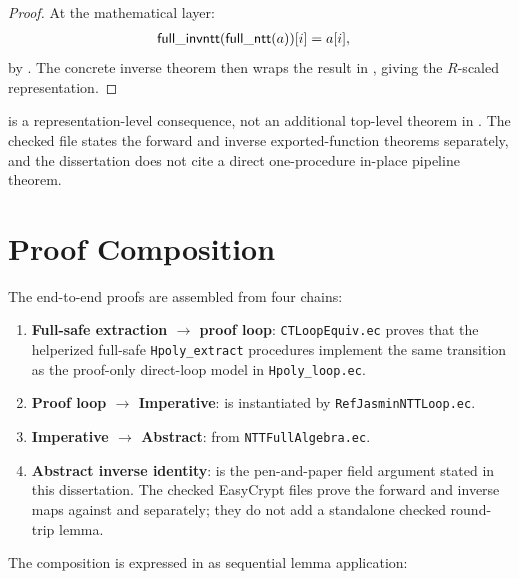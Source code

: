 \begin{proof}
  At the mathematical layer:
  \begin{align*}
    \mathsf{full\_invntt}(\mathsf{full\_ntt}(a))[i]
    &= a[i],
  \end{align*}
  by .  The concrete inverse theorem then wraps the
  result in , giving the \(R\)-scaled representation.
\end{proof}

 is a representation-level consequence, not an additional
top-level theorem in .  The checked file states the forward
and inverse exported-function theorems separately, and the dissertation does
not cite a direct one-procedure in-place pipeline theorem.

\section{Proof Composition}

The end-to-end proofs are assembled from four chains:

\begin{enumerate}
  \item \textbf{Full-safe extraction $\to$ proof loop}:
        \texttt{CTLoopEquiv.ec} proves that the helperized full-safe
        \texttt{Hpoly\_extract} procedures implement the same transition as
        the proof-only direct-loop model in \texttt{Hpoly\_loop.ec}.
  \item \textbf{Proof loop $\to$ Imperative}:  is
        instantiated by \texttt{RefJasminNTT\allowbreak Loop.ec}.
  \item \textbf{Imperative $\to$ Abstract}:  from
        \texttt{NTTFullAlgebra.ec}.
  \item \textbf{Abstract inverse identity}:  is the
        pen-and-paper field argument stated in this dissertation.  The
        checked EasyCrypt files prove the forward and inverse maps against
         and  separately; they do not add a
        standalone checked round-trip lemma.
\end{enumerate}

The composition is expressed in \easycrypt{} as sequential lemma application:

